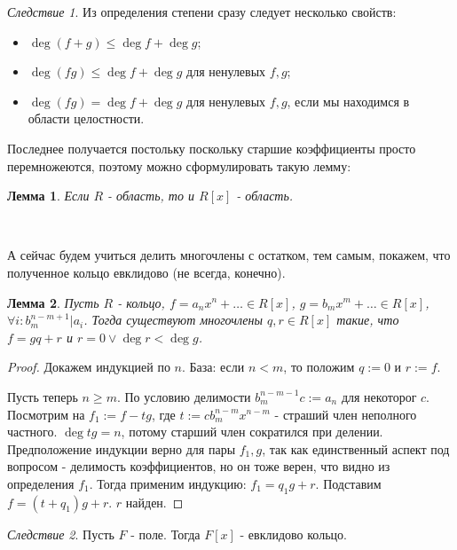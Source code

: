 \documentclass[a4paper,100pt]{article}
\theoremstyle{indented}
\newtheorem{lemma}{Лемма}
\theoremstyle{definition}
\theoremstyle{remark}
\newtheorem{cons}{Следствие}
\begin{document}
\begin{cons}
    Из определения степени сразу следует несколько свойств: \

    \begin{itemize}
        \item $\deg(f+g)\leq\deg f+\deg g$;
        \item $\deg(fg)\leq\deg f+\deg g$ для ненулевых $f, g$;
        \item $\deg(fg)=\deg f+\deg g$ для ненулевых $f, g$, если мы находимся в области целостности.
    \end{itemize}
\end{cons}

Последнее получается постольку поскольку старшие коэффициенты просто перемножеются, поэтому можно сформулировать такую лемму:\\

\begin{lemma}
    Если $R$ - область, то и $R[x]$ - область.
\end{lemma}\

А сейчас будем учиться делить многочлены с остатком, тем самым, покажем, что полученное кольцо евклидово (не всегда, конечно).\\

\begin{lemma}
    Пусть $R$ - кольцо, $f=a_nx^n+\dots \in R[x]$, $g=b_mx^m+\dots\in R[x]$, $\forall i: b_m^{n-m+1}\vert a_i$. Тогда существуют многочлены $q,r\in R[x]$ такие, что $f=gq+r$ и $r=0\vee \deg r<\deg g$.
\end{lemma}

\begin{proof}
    Докажем индукцией по $n$. База: если  $n<m$, то положим $q:=0$ и $r:=f$.\ 

    Пусть теперь $n\geq m$. По условию делимости $b_m^{n-m-1}c:=a_n$ для некоторог $c$. Посмотрим на $f_1:=f-tg$, где $t:=cb_m^{n-m}x^{n-m}$ - страший член неполного частного. $\deg tg = n$, потому старший член сократился при делении. Предположение индукции верно для пары $f_1,g$, так как единственный аспект под вопросом - делимость коэффициентов, но он тоже верен, что видно из определения $f_1$. Тогда применим индукцию: $f_1=q_1g+r$. Подставим $f=(t+q_1)g+r$. $r$ найден.
\end{proof}

\begin{cons}
    Пусть $F$ - поле. Тогда $F[x]$ - евклидово кольцо.
\end{cons}
\end{document}
